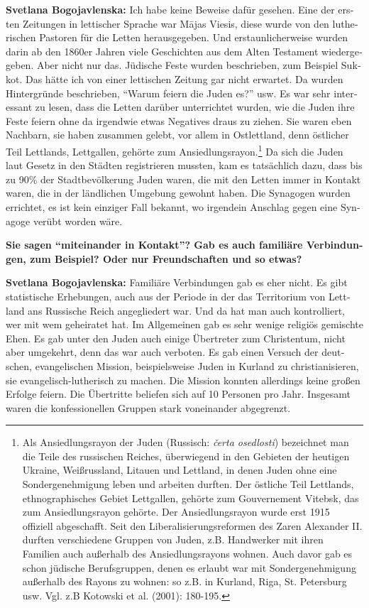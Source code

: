 \begin{otherlanguage}{ngerman}
\textbf{Svetlana Bogojavlenska:} Ich habe keine Beweise dafür gesehen. Eine der ersten Zeitungen in lettischer Sprache war Mājas Viesis, diese wurde von den lutherischen Pastoren für die Letten herausgegeben. Und erstaunlicherweise wurden darin ab den 1860er Jahren viele Geschichten aus dem Alten Testament wiedergegeben. Aber nicht nur das. Jüdische Feste wurden beschrieben, zum Beispiel Sukkot. Das hätte ich von einer lettischen Zeitung gar nicht erwartet. Da wurden Hintergründe beschrieben, "`Warum feiern die Juden es?"' usw. Es war sehr interessant zu lesen, dass die Letten darüber unterrichtet wurden, wie die Juden ihre Feste feiern ohne da irgendwie etwas Negatives draus zu ziehen. Sie waren eben Nachbarn, sie haben zusammen gelebt, vor allem in Ostlettland, denn östlicher Teil Lettlands, Lettgallen, gehörte zum Ansiedlungsrayon.\footnote{Als Ansiedlungsrayon der Juden (Russisch: \textit{čerta osedlosti}) bezeichnet man die Teile des russischen Reiches, überwiegend in den Gebieten der heutigen Ukraine, Weißrussland, Litauen und Lettland, in denen Juden ohne eine Sondergenehmigung leben und arbeiten durften. Der östliche Teil Lettlands, ethnographisches Gebiet Lettgallen, gehörte zum Gouvernement Vitebsk, das zum Ansiedlungsrayon gehörte. Der Ansiedlungsrayon wurde erst 1915 offiziell abgeschafft. Seit den Liberalisierungsreformen des Zaren Alexander II. durften verschiedene Gruppen von Juden, z.B. Handwerker mit ihren Familien auch außerhalb des Ansiedlungsrayons wohnen. Auch davor gab es schon jüdische Berufsgruppen, denen es erlaubt war mit Sondergenehmigung außerhalb des Rayons zu wohnen: so z.B. in Kurland, Riga, St. Petersburg usw. Vgl. z.B Kotowski et al. (2001): 180-195.} Da sich die Juden laut Gesetz in den Städten registrieren mussten, kam es tatsächlich dazu, dass bis zu 90\% der Stadtbevölkerung Juden waren, die mit den Letten immer in Kontakt waren, die in der ländlichen Umgebung gewohnt haben. Die Synagogen wurden errichtet, es ist kein einziger Fall bekannt, wo irgendein Anschlag gegen eine Synagoge verübt worden wäre.

\textbf{Sie sagen "`miteinander in Kontakt"'? Gab es auch familiäre Verbindungen, zum Beispiel? Oder nur Freundschaften und so etwas?}

\textbf{Svetlana Bogojavlenska:} Familiäre Verbindungen gab es eher nicht. Es gibt statistische Erhebungen, auch aus der Periode in der das Territorium von Lettland ans Russische Reich angegliedert war. Und da hat man auch kontrolliert, wer mit wem geheiratet hat. Im Allgemeinen gab es sehr wenige religiös gemischte Ehen. Es gab unter den Juden auch einige Übertreter zum Christentum, nicht aber umgekehrt, denn das war auch verboten. Es gab einen Versuch der deutschen, evangelischen Mission, beispielsweise Juden in Kurland zu christianisieren, sie evangelisch-lutherisch zu machen. Die Mission konnten allerdings keine großen Erfolge feiern. Die Übertritte beliefen sich auf 10 Personen pro Jahr. Insgesamt waren die konfessionellen Gruppen stark voneinander abgegrenzt.


\end{otherlanguage}

